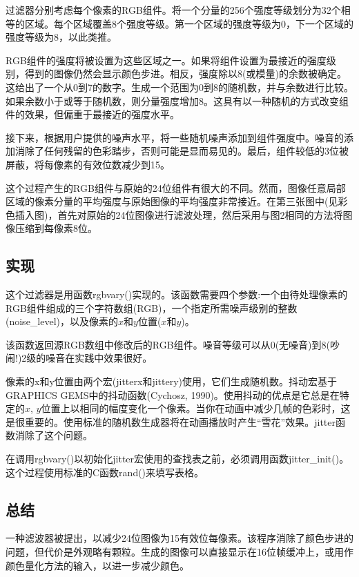 \begin{CJK}{UTF8}{gbsn}
过滤器分别考虑每个像素的RGB组件。将一个分量的256个强度等级划分为32个相等的区域。每个区域覆盖8个强度等级。第一个区域的强度等级为0，下一个区域的强度等级为8，以此类推。

RGB组件的强度将被设置为这些区域之一。如果将组件设置为最接近的强度级别，得到的图像仍然会显示颜色步进。相反，强度除以8(或模量)的余数被确定。这给出了一个从0到7的数字。生成一个范围为0到8的随机数，并与余数进行比较。如果余数小于或等于随机数，则分量强度增加8。这具有以一种随机的方式改变组件的效果，但偏重于最接近的强度水平。

接下来，根据用户提供的噪声水平，将一些随机噪声添加到组件强度中。噪音的添加消除了任何残留的色彩踏步，否则可能是显而易见的。最后，组件较低的3位被屏蔽，将每像素的有效位数减少到15。

这个过程产生的RGB组件与原始的24位组件有很大的不同。然而，图像任意局部区域的像素分量的平均强度与原始图像的平均强度非常接近。在第三张图中(见彩色插入图)，首先对原始的24位图像进行滤波处理，然后采用与图2相同的方法将图像压缩到每像素8位。
\subsection*{实现}
这个过滤器是用函数rgbvary()实现的。该函数需要四个参数:一个由待处理像素的RGB组件组成的三个字符数组(RGB)，一个指定所需噪声级别的整数(noise\_level)，以及像素的$x$和$y$位置($x$和$y$)。

该函数返回源RGB数组中修改后的RGB组件。噪音等级可以从0(无噪音)到8(吵闹!)2级的噪音在实践中效果很好。

像素的x和y位置由两个宏(jitterx和jittery)使用，它们生成随机数。抖动宏基于GRAPHICS GEMS中的抖动函数(Cychosz, 1990)。使用抖动的优点是它总是在特定的$x$, $y$位置上以相同的幅度变化一个像素。当你在动画中减少几帧的色彩时，这是很重要的。使用标准的随机数生成器将在动画播放时产生“雪花”效果。jitter函数消除了这个问题。

在调用rgbvary()以初始化jitter宏使用的查找表之前，必须调用函数jitter\_init()。这个过程使用标准的C函数rand()来填写表格。

\subsection*{总结}

一种滤波器被提出，以减少24位图像为15有效位每像素。该程序消除了颜色步进的问题，但代价是外观略有颗粒。生成的图像可以直接显示在16位帧缓冲上，或用作颜色量化方法的输入，以进一步减少颜色。


\end{CJK}
